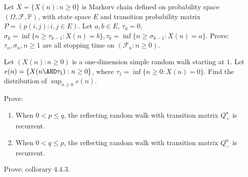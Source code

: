 \documentclass{ctexart}
\newif\ifpreface
\begin{document}
\large
\setlength{\baselineskip}{1.2em}
\ifpreface
  
\else
\fi
{}
\begin{problem}\label{pro:1}
  Let \(X=\{X(n): n \geq 0\}\) is Markorv chain defined on probability space \((\Omega,\mathscr{F},\mathbb{P})\), with state space \(E\) and
  transition probability matrix \(P=(p(i,j):i,j \in E)\). Let \(a, b \in E\), \(\tau_0 =0\), \(\sigma_k = \inf \{n \geq \tau_{k-1}: X(n)=b\}, \tau_k=\inf\{n \geq \sigma_{k-1}: X(n)=a\}\).
  Prove: \(\tau_n,\sigma_n, n \geq 1 \) are all stopping time on \((\mathscr{F}_n: n \geq 0)\).
\end{problem}
\begin{problem}\label{pro:2}
  Let \((X(n): n \geq 0)\) is a one-dimension simple random walk starting at \(1\). Let \(e(n)=\{X(n \AND \tau_1): n \geq 0\}\), where \(\tau_1=\inf \{n \geq 0: X(n)=0\}\).
  Find the distribution of \(\sup_{n \geq 0}e(n)\).
\end{problem}
\begin{problem}\label{pro:3}
  Prove:
  \begin{enumerate}
    \item When \(0 < p \leq q\), the reflecting random walk with transition matrix \(Q^a_+\) is recurrent.
    \item When \(0 < q \leq p\), the reflecting random walk with transition matrix \(Q^a_-\) is recurrent.
  \end{enumerate}
\end{problem}
\begin{problem}\label{pro:4}
  Prove: collorary \(4.4.3\).
\end{problem}
\end{document}
